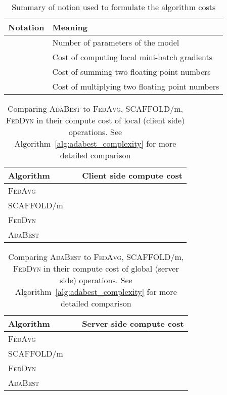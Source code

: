 \documentclass[runningheads]{llncs}
\newcommand{\fedavg}{\textsc{FedAvg}\xspace}
\newcommand{\scaffold}{\textsc{SCAFFOLD}\xspace}
\newcommand{\feddyn}{\textsc{FedDyn}\xspace}
\newcommand{\ours}{\textsc{AdaBest}\xspace}
\begin{document}
\begin{table}
\caption{Summary of notion used to formulate the algorithm costs}
\label{tb:cost_notation}
\begin{center}
\begin{small}
\begin{tabular}{c@{\hskip 10pt}l}
\toprule
Notation & Meaning \\
\midrule
 & Number of parameters of the model  \\
 & Cost of computing local mini-batch gradients\\
 & Cost of summing two floating point numbers\\
 & Cost of multiplying two floating point numbers\\
\bottomrule
\end{tabular}
\end{small}
\end{center}
\end{table} 

\begin{table}
\caption{Comparing \ours to \fedavg, \scaffold/m, \feddyn in their compute cost of local (client side) operations. See Algorithm~\ref{alg:adabest_complexity} for more detailed comparison}
\label{tb:cost_comp_client}
\begin{center}
\begin{tabular}{l@{\hskip 10pt}l}
\toprule
Algorithm & Client side compute cost \\
\midrule
\fedavg \ \  &  \\
\scaffold/m \ \  &  \\
\feddyn \ \  &  \\
\ours \ \  &  \\
\bottomrule
\end{tabular}
\end{center}
\end{table} 

\begin{table}
\caption{Comparing \ours to \fedavg, \scaffold/m, \feddyn in their compute cost of global (server side) operations. See Algorithm~\ref{alg:adabest_complexity} for more detailed comparison}
\label{tb:cost_comp_server}
\begin{center}
\begin{tabular}{l@{\hskip 10pt}l}
\toprule
Algorithm & Server side compute cost \\
\midrule
\fedavg \ \  &  \\
\scaffold/m \ \  &  \\
\feddyn \ \  &  \\
\ours \ \  &  \\
\bottomrule
\end{tabular}
\end{center}
\end{table}
 
\end{document}
